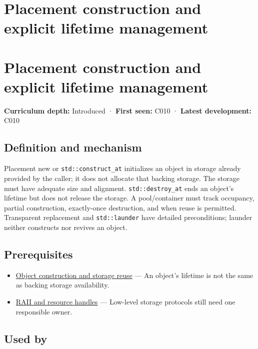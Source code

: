 \hypertarget{appendix-f56c3e43fd4e}{}
\section*{Placement construction and explicit lifetime management}
\section{Placement construction and explicit lifetime management}\label{placement-construction-and-explicit-lifetime-management}

\textbf{Curriculum depth:} Introduced · \textbf{First seen:} C010 · \textbf{Latest development:} C010

\subsection{Definition and mechanism}\label{definition-and-mechanism}

Placement new or \texttt{std::construct\_at} initializes an object in storage already provided by the caller; it does not allocate that backing storage. The storage must have adequate size and alignment. \texttt{std::destroy\_at} ends an object's lifetime but does not release the storage. A pool/container must track occupancy, partial construction, exactly-once destruction, and when reuse is permitted. Transparent replacement and \texttt{std::launder} have detailed preconditions; launder neither constructs nor revives an object.

\subsection{Prerequisites}\label{prerequisites}

\begin{itemize}
\tightlist
\item
  \hyperref[appendix-a82f9c438857]{Object construction and storage reuse} --- An object's lifetime is not the same as backing storage availability.
\item
  \hyperref[appendix-69739d3ab49b]{RAII and resource handles} --- Low-level storage protocols still need one responsible owner.
\end{itemize}

\subsection{Used by}\label{used-by}

